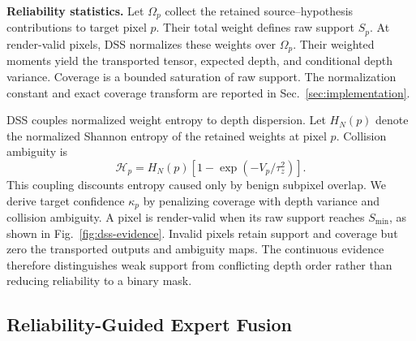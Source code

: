 \documentclass[letterpaper,10pt,conference]{ieeeconf}
\begin{document}
\noindent\textbf{Reliability statistics.}
Let $\Omega_p$ collect the retained source--hypothesis contributions to target
pixel $p$. Their total weight defines raw support $S_p$. At render-valid pixels,
DSS normalizes these weights over $\Omega_p$. Their weighted moments yield the
transported tensor, expected depth, and conditional depth variance. Coverage
is a bounded saturation of raw support. The normalization constant and exact
coverage transform are reported in Sec.~\ref{sec:implementation}.

DSS couples normalized weight entropy to depth dispersion. Let $H_N(p)$ denote
the normalized Shannon entropy of the retained weights at pixel $p$. Collision
ambiguity is
\begin{equation}
 \mathcal H_p
 =H_N(p)\left[1-\exp(-V_p/\tau_z^2)\right].
\label{eq:collision-entropy}
\end{equation}
This coupling discounts entropy caused only by benign subpixel overlap. We
derive target confidence $\kappa_p$ by penalizing coverage with depth variance
and collision ambiguity. A pixel is render-valid when its raw support reaches
$S_{\min}$, as shown in Fig.~\ref{fig:dss-evidence}. Invalid pixels retain
support and coverage but zero the transported outputs and ambiguity maps. The
continuous evidence therefore distinguishes weak support from conflicting depth
order rather than reducing reliability to a binary mask.

\subsection{Reliability-Guided Expert Fusion}
\end{document}
